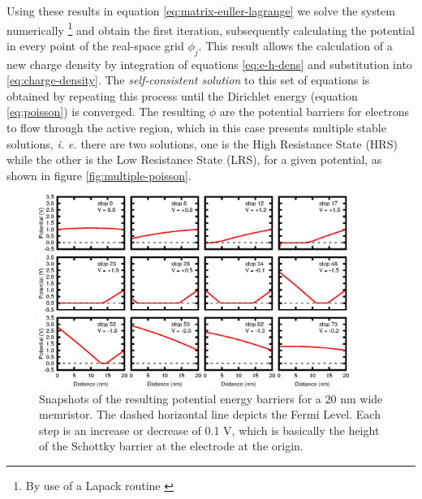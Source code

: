 Using these results in equation \ref{eq:matrix-euller-lagrange} we solve the system numerically \footnote{By use of a Lapack routine \cite{lapack}} and obtain the first iteration, subsequently calculating the potential in every point of the real-space grid $\phi_j$. This result allows the calculation of a new charge density by integration of equations \ref{eq:e-h-dens} and substitution into \ref{eq:charge-density}. The \textit{self-consistent solution} to this set of equations is obtained by repeating this process until the Dirichlet energy (equation \ref{eq:poisson}) is converged. The resulting $\phi$ are the potential barriers for electrons to flow through the active region, which in this case presents multiple stable solutions, \textit{i. e.} there are two solutions, one is the High Resistance State (HRS) while the other is the Low Resistance State (LRS), for a given potential, as shown in figure \ref{fig:multiple-poisson}. 
\begin{center}
  \begin{figure}[h!]
    \begin{center}
      \includegraphics[width=0.9\textwidth]{img/switch-4x3.jpg}    
      \caption{Snapshots of the resulting potential energy barriers for a 20 nm wide memristor. The dashed horizontal line depicts the Fermi Level. Each step is an increase or decrease of 0.1 V, which is basically the height of the Schottky barrier at the electrode at the origin.} 
      \label{fig:potentials} 
    \end{center}
  \end{figure}
\end{center}

